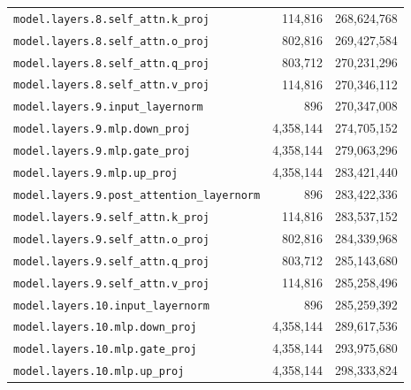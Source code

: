 \documentclass[10pt,a4paper]{article}
\theoremstyle{definition}
\begin{document}
\begin{appendices}
\begin{longtable}{p{9.5cm}rr}
\texttt{model.\allowbreak{}layers.\allowbreak{}8.\allowbreak{}self\_attn.\allowbreak{}k\_proj} & 114,816 & 268,624,768 \\
\texttt{model.\allowbreak{}layers.\allowbreak{}8.\allowbreak{}self\_attn.\allowbreak{}o\_proj} & 802,816 & 269,427,584 \\
\texttt{model.\allowbreak{}layers.\allowbreak{}8.\allowbreak{}self\_attn.\allowbreak{}q\_proj} & 803,712 & 270,231,296 \\
\texttt{model.\allowbreak{}layers.\allowbreak{}8.\allowbreak{}self\_attn.\allowbreak{}v\_proj} & 114,816 & 270,346,112 \\
\texttt{model.\allowbreak{}layers.\allowbreak{}9.\allowbreak{}input\_layernorm} & 896 & 270,347,008 \\
\texttt{model.\allowbreak{}layers.\allowbreak{}9.\allowbreak{}mlp.\allowbreak{}down\_proj} & 4,358,144 & 274,705,152 \\
\texttt{model.\allowbreak{}layers.\allowbreak{}9.\allowbreak{}mlp.\allowbreak{}gate\_proj} & 4,358,144 & 279,063,296 \\
\texttt{model.\allowbreak{}layers.\allowbreak{}9.\allowbreak{}mlp.\allowbreak{}up\_proj} & 4,358,144 & 283,421,440 \\
\texttt{model.\allowbreak{}layers.\allowbreak{}9.\allowbreak{}post\_attention\_layernorm} & 896 & 283,422,336 \\
\texttt{model.\allowbreak{}layers.\allowbreak{}9.\allowbreak{}self\_attn.\allowbreak{}k\_proj} & 114,816 & 283,537,152 \\
\texttt{model.\allowbreak{}layers.\allowbreak{}9.\allowbreak{}self\_attn.\allowbreak{}o\_proj} & 802,816 & 284,339,968 \\
\texttt{model.\allowbreak{}layers.\allowbreak{}9.\allowbreak{}self\_attn.\allowbreak{}q\_proj} & 803,712 & 285,143,680 \\
\texttt{model.\allowbreak{}layers.\allowbreak{}9.\allowbreak{}self\_attn.\allowbreak{}v\_proj} & 114,816 & 285,258,496 \\
\texttt{model.\allowbreak{}layers.\allowbreak{}10.\allowbreak{}input\_layernorm} & 896 & 285,259,392 \\
\texttt{model.\allowbreak{}layers.\allowbreak{}10.\allowbreak{}mlp.\allowbreak{}down\_proj} & 4,358,144 & 289,617,536 \\
\texttt{model.\allowbreak{}layers.\allowbreak{}10.\allowbreak{}mlp.\allowbreak{}gate\_proj} & 4,358,144 & 293,975,680 \\
\texttt{model.\allowbreak{}layers.\allowbreak{}10.\allowbreak{}mlp.\allowbreak{}up\_proj} & 4,358,144 & 298,333,824 \\

\end{longtable}
\end{appendices}
\end{document}
